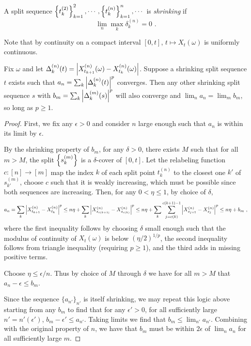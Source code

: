 \documentclass{article}
\begin{document}
       \begin{definition}
         A split sequence \(\left\{{t_k^{(2)}}\right\}_{k=1}^2,\cdots,\left\{{t_k^{(n)}}\right\}_{k=1}^n,\cdots\) is {\em shrinking} if \[\lim_n\max_k\delta_k^{(n)}=0\,\,.\]
       \end{definition}

       Note that by continuity on a compact interval \([0, t]\), \(t\mapsto X_t(\omega)\) is uniformly continuous.

       \begin{lemma}
         Fix \(\omega\) and let \(\Delta_k^{(n)}(t)=\left\lvert{X_{t_{k+1}}^{(n)}(\omega)-X_{t_{k}}^{(n)}(\omega)}\right\rvert\). Suppose a shrinking split sequence \(t\) exists such that \(a_n=\sum_{k}\left\lvert{\Delta_k^{(n)}(t)}\right\rvert^p\) converges. Then any other shrinking split sequence \(s\) with \(b_m=\sum_{k}\left\lvert{\Delta_k^{(m)}(s)}\right\rvert^p\) will also converge and \(\lim_n a_n = \lim_m b_m\), so long as \(p\ge 1\).
       \end{lemma}

       \begin{proof}

         First, we fix any \(\epsilon>0\) and consider \(n\) large enough such that \(a_n\) is within its limit by \(\epsilon\).

         By the shrinking property of \(b_m\), for any \(\delta>0\), there exists \(M\) such that for all \(m>M\), the split \(\left\{{s_k^{(m)}}\right\}\) is a \(\delta\)-cover of \([0, t]\). Let the relabeling function \(c:[n]\rightarrow[m]\) map the index \(k\) of each split point \(t_k^{(n)}\) to the closest one \(k'\) of \(s_{k'}^{(m)}\), choose \(c\) such that it is weakly increasing, which must be possible since both sequences are increasing. Then, for any \(0<\eta\le 1\), by choice of \(\delta\),
         \[
           a_n=\sum_k\left\lvert{X_{t_{k+1}}^{(n)}-X_{t_k}^{(n)}}\right\rvert^p\le n\eta + \sum_k\left\lvert{X_{s_{c(k+1)}}^{(n)}-X_{s_{c(k)}}^{(n)}}\right\rvert^p\le n\eta + \sum_k\sum_{j=c(k)}^{c(k+1)-1}\left\lvert{X_{s_{j+1}}^{(n)}-X_{s_j}^{(n)}}\right\rvert^p\le n\eta + b_m\,\,,
         \]
         where the first inequality follows by choosing \(\delta\) small enough such that the modulus of continuity of \(X_t(\omega)\) is below \((\eta/2)^{1/p}\), the second inequality follows from triangle inequality (requiring \(p\ge 1\)), and the third adds in missing positive terms.

         Choose \(\eta\le \epsilon/n\). Thus by choice of \(M\) through \(\delta\) we have for all \(m>M\) that \(a_n-\epsilon\le b_m\).

         Since the sequence \(\{a_{n'}\}_{n'}\) is itself shrinking, we may repeat this logic above starting from any \(b_m\) to find that for any \(\epsilon'>0\), for all sufficiently large \(n'=n'(\epsilon')\), \(b_m-\epsilon'\le a_{n'}\). Taking limits we find that \(b_m\le \lim_{n'} a_{n'}\). Combining with the original property of \(n\), we have that \(b_m\) must be within \(2\epsilon\) of \(\lim_n a_n\) for all sufficiently large \(m\).

       \end{proof}
\end{document}

